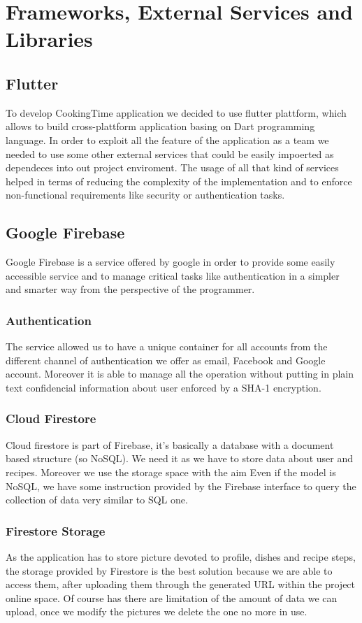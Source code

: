 \chapter{Frameworks, External Services and Libraries}

\section{Flutter}
To develop CookingTime application we decided to use flutter plattform, which allows to build cross-plattform application basing on Dart programming language. 
In order to exploit all the feature of the application as a team we needed to use some other external services that could be easily impoerted as dependeces into out project enviroment. 
The usage of all that kind of services helped in terms of reducing the complexity of the implementation and to enforce non-functional requirements like security or authentication tasks.

\section{Google Firebase}
Google Firebase is a service offered by google in order to provide some easily accessible service and to manage critical tasks like authentication in a simpler and smarter way from the perspective of the programmer.
\subsection{Authentication}
The service allowed us to have a unique container for all accounts from the different channel of authentication we offer as email, Facebook and Google account. 
Moreover it is able to manage all the operation without putting in plain text confidencial information about user enforced by a SHA-1 encryption.

\subsection{Cloud Firestore}
Cloud firestore is part of Firebase, it's basically a database with a document based structure (so NoSQL). We need it as we have to store data about user and recipes.
Moreover we use the storage space with the aim  
Even if the model is NoSQL, we have some instruction provided by the Firebase interface to query the collection of data very similar to SQL one.

\subsection{Firestore Storage}
As the application has to store picture devoted to profile, dishes and recipe steps, the storage provided by Firestore is the best solution because we are able to access them, after uploading them through the generated URL within the project online space. 
Of course has there are limitation of the amount of data we can upload, once we modify the pictures we delete the one no more in use.

